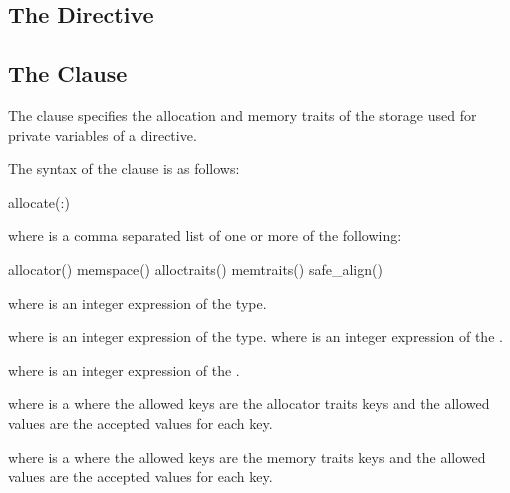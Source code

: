\subsection{The  Directive}
\label{subsec:deallocate Directive}
\summary

\syntax

\description


\subsection{The  Clause}
\label{subsec:allocate Clause}
\summary
The  clause specifies the allocation and memory traits of the storage used for private variables of a directive.

\syntax

The syntax of the  clause is as follows:

\begin{boxedcode}
allocate(\plc{[modifiers}:\plc{] list})
\end{boxedcode}
where  is a comma separated list of one or more of the following:

\begin{indentedcodelist}
allocator()
memspace()
alloctraits()
memtraits()
safe_align()
\end{indentedcodelist}

\ccppspecificstart
where  is an integer expression of the  type.

where  is an integer expression of the  type.
\ccppspecificend
\fortranspecificstart
where  is an integer expression of the  .

where  is an integer expression of the  .
\fortranspecificend

where  is a  where the allowed keys are the allocator traits keys and the allowed values are the accepted values for each key.

where  is a  where the allowed keys are the memory traits keys and the allowed values are the accepted values for each key.

